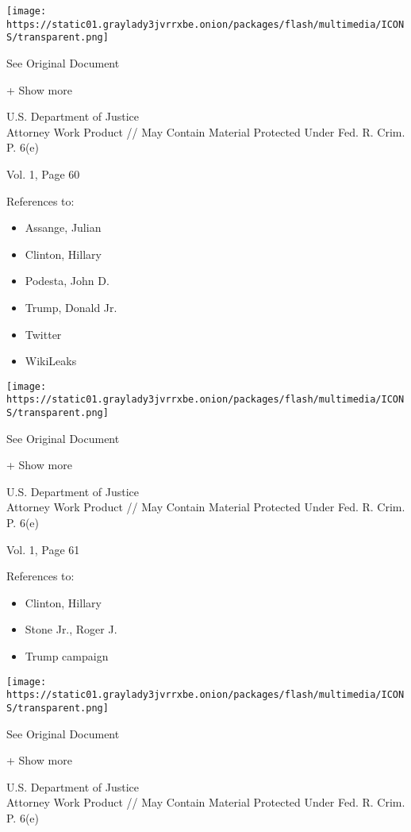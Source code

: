 \protect\hyperlink{}{}

\texttt{[image: https://static01.graylady3jvrrxbe.onion/packages/flash/multimedia/ICONS/transparent.png]}

See Original Document

+ Show more

U.S. Department of Justice\\
Attorney Work Product // May Contain Material Protected Under Fed. R.
Crim. P. 6(e)

Vol. 1, Page 60

References to:

\begin{itemize}
\tightlist
\item
  Assange, Julian
\item
  Clinton, Hillary
\item
  Podesta, John D.
\item
  Trump, Donald Jr.
\item
  Twitter
\item
  WikiLeaks
\end{itemize}

\protect\hyperlink{}{}

\texttt{[image: https://static01.graylady3jvrrxbe.onion/packages/flash/multimedia/ICONS/transparent.png]}

See Original Document

+ Show more

U.S. Department of Justice\\
Attorney Work Product // May Contain Material Protected Under Fed. R.
Crim. P. 6(e)

Vol. 1, Page 61

References to:

\begin{itemize}
\tightlist
\item
  Clinton, Hillary
\item
  Stone Jr., Roger J.
\item
  Trump campaign
\end{itemize}

\protect\hyperlink{}{}

\texttt{[image: https://static01.graylady3jvrrxbe.onion/packages/flash/multimedia/ICONS/transparent.png]}

See Original Document

+ Show more

U.S. Department of Justice\\
Attorney Work Product // May Contain Material Protected Under Fed. R.
Crim. P. 6(e)

